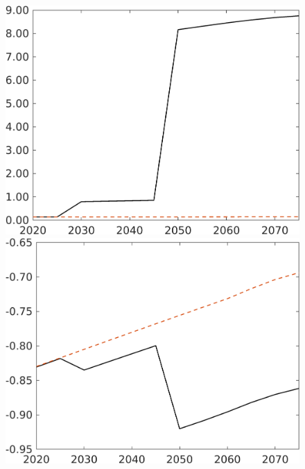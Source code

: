 \begin{figure}[h!!]
\begin{minipage}[]{0.32\textwidth}
\end{minipage}
	\begin{minipage}[]{0.32\textwidth}
	\includegraphics[width=1\textwidth]{../../codding_model/own_basedOnFried/optimalPol_190722_tidiedUp/figures/all_July22/GFF_TargetCompSP_T_spillover0_noskill0_sep1_xgrowth0_etaa0.79_lgd0.png}
\end{minipage}
	\begin{minipage}[]{0.32\textwidth}
	\includegraphics[width=1\textwidth]{../../codding_model/own_basedOnFried/optimalPol_190722_tidiedUp/figures/all_July22/SWF_TargetCompSP_T_spillover0_noskill0_sep1_xgrowth0_etaa0.79_lgd0.png}
\end{minipage}


\end{figure}
